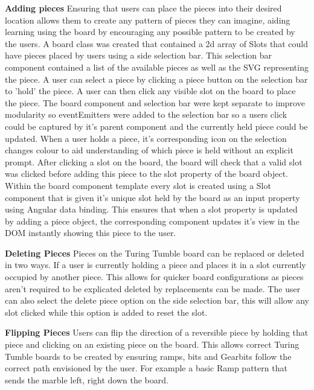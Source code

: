\documentclass{l4proj}
\begin{document}
\textbf{Adding pieces}
Ensuring that users can place the pieces into their desired location allows them to create any pattern of pieces they can imagine, aiding learning using the board by encouraging any possible pattern to be created by the users. A board class was created that contained a 2d array of Slots that could have pieces placed by users using a side selection bar. This selection bar component contained a list of the available pieces as well as the SVG representing the piece. A user can select a piece by clicking a piece button on the selection bar to 'hold' the piece. A user can then click any visible slot on the board to place the piece. The board component and selection bar were kept separate to improve modularity so eventEmitters were added to the selection bar so a users click could be captured by it's parent component and the currently held piece could be updated. When a user holds a piece, it's corresponding icon on the selection changes colour to aid understanding of which piece is held without an explicit prompt. After clicking a slot on the board, the board will check that a valid slot was clicked before adding this piece to the slot property of the board object. Within the board component template every slot is created using a Slot component that is given it's unique slot held by the board as an input property using Angular data binding. This ensures that when a slot property is updated by adding a piece object, the corresponding component updates it's view in the DOM instantly showing this piece to the user.

\textbf{Deleting Pieces}
Pieces on the Turing Tumble board can be replaced or deleted in two ways. If a user is currently holding a piece and places it in a slot currently occupied by another piece. This allows for quicker board configurations as pieces aren't required to be explicated deleted by replacements can be made. The user can also select the delete piece option on the side selection bar, this will allow any slot clicked while this option is added to reset the slot.

\textbf{Flipping Pieces}
Users can flip the direction of a reversible piece by holding that piece and clicking on an existing piece on the board. This allows correct Turing Tumble boards to be created by ensuring ramps, bits and Gearbits follow the correct path envisioned by the user. For example a basic Ramp pattern that sends the marble left, right down the board. 
\end{document}
